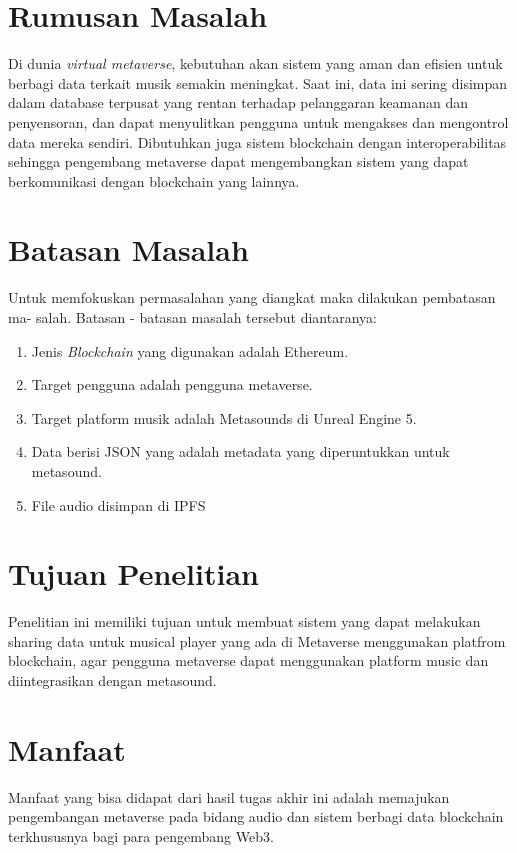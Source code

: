 \section{Rumusan Masalah}

Di dunia \emph{virtual metaverse}, kebutuhan akan sistem yang aman dan efisien untuk berbagi data terkait musik semakin meningkat.
Saat ini, data ini sering disimpan dalam database terpusat yang rentan terhadap pelanggaran keamanan dan
penyensoran, dan dapat menyulitkan pengguna untuk mengakses dan mengontrol data mereka sendiri. Dibutuhkan juga sistem blockchain dengan interoperabilitas sehingga
pengembang metaverse dapat mengembangkan sistem yang dapat berkomunikasi dengan blockchain yang lainnya.

\section{Batasan Masalah}

Untuk memfokuskan permasalahan yang diangkat maka dilakukan pembatasan ma-
salah. Batasan - batasan masalah tersebut diantaranya:
\begin{enumerate}
  \item Jenis \emph{Blockchain} yang digunakan adalah Ethereum.
  \item Target pengguna adalah pengguna metaverse.
  \item Target platform musik adalah Metasounds di Unreal Engine 5.
  \item Data berisi JSON yang adalah metadata yang diperuntukkan untuk metasound.
  \item File audio disimpan di IPFS
\end{enumerate}

\section{Tujuan Penelitian}

Penelitian ini memiliki tujuan untuk membuat sistem yang
dapat melakukan sharing data untuk musical player yang ada
di Metaverse menggunakan platfrom blockchain, agar
pengguna metaverse dapat menggunakan platform music
dan diintegrasikan dengan metasound.

\section{Manfaat}
Manfaat yang bisa didapat dari hasil tugas akhir ini adalah
memajukan pengembangan metaverse pada bidang audio dan sistem berbagi data blockchain
terkhususnya bagi para pengembang Web3.
